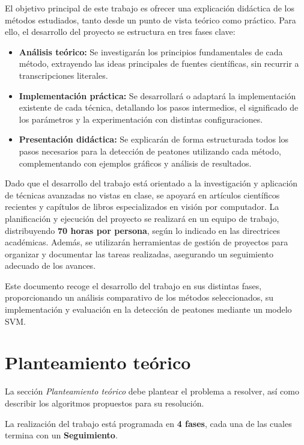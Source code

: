 \documentclass[a4paper]{article}
\begin{document}
 El objetivo principal de este trabajo es ofrecer una explicación didáctica de los métodos estudiados, tanto desde un punto de vista teórico como práctico. Para ello, el desarrollo del proyecto se estructura en tres fases clave:
 
 \begin{itemize}
     \item \textbf{Análisis teórico:} Se investigarán los principios fundamentales de cada método, extrayendo las ideas principales de fuentes científicas, sin recurrir a transcripciones literales.
     \item \textbf{Implementación práctica:} Se desarrollará o adaptará la implementación existente de cada técnica, detallando los pasos intermedios, el significado de los parámetros y la experimentación con distintas configuraciones.
     \item \textbf{Presentación didáctica:} Se explicarán de forma estructurada todos los pasos necesarios para la detección de peatones utilizando cada método, complementando con ejemplos gráficos y análisis de resultados.
 \end{itemize}
 
 Dado que el desarrollo del trabajo está orientado a la investigación y aplicación de técnicas avanzadas no vistas en clase, se apoyará en artículos científicos recientes y capítulos de libros especializados en visión por computador. La planificación y ejecución del proyecto se realizará en un equipo de trabajo, distribuyendo \textbf{70 horas por persona}, según lo indicado en las directrices académicas. Además, se utilizarán herramientas de gestión de proyectos para organizar y documentar las tareas realizadas, asegurando un seguimiento adecuado de los avances. 
 
 Este documento recoge el desarrollo del trabajo en sus distintas fases, proporcionando un análisis comparativo de los métodos seleccionados, su implementación y evaluación en la detección de peatones mediante un modelo SVM.
 
\section{Planteamiento teórico}

La sección \textit{Planteamiento teórico} debe plantear el problema a resolver, así como describir los algoritmos propuestos para su resolución. 

La realización del trabajo está programada en {\bf 4 fases}, cada una de las cuales termina con un {\bf Seguimiento}.
\end{document}
